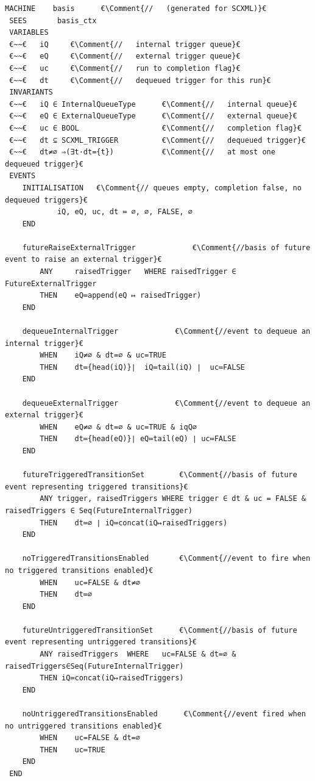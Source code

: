  \begin{lstfloat}[!tb]
 \begin{lstlisting}[caption={Abstract basis machine}, label={lst:BasisMachine},language=Event-B, escapechar=€, frame=single, basicstyle=\rmfamily\scriptsize, belowskip=-2.0 \baselineskip]
 MACHINE	basis	   €\Comment{//   (generated for SCXML)}€
 SEES    	basis_ctx
 VARIABLES
 €~~€	iQ	   €\Comment{//   internal trigger queue}€
 €~~€	eQ	   €\Comment{//   external trigger queue}€
 €~~€	uc	   €\Comment{//   run to completion flag}€
 €~~€	dt	   €\Comment{//   dequeued trigger for this run}€
 INVARIANTS
 €~~€	iQ ∈ InternalQueueType	   	€\Comment{//   internal queue}€
 €~~€	eQ ∈ ExternalQueueType	   	€\Comment{//   external queue}€
 €~~€	uc ∈ BOOL	   				€\Comment{//   completion flag}€
 €~~€	dt ⊆ SCXML_TRIGGER	   		€\Comment{//   dequeued trigger}€
 €~~€	dt≠∅ ⇒(∃t·dt={t})			€\Comment{//   at most one dequeued trigger}€
 EVENTS
 	INITIALISATION   €\Comment{// queues empty, completion false, no dequeued triggers}€
 			iQ, eQ, uc, dt ≔ ∅,	∅, FALSE, ∅  
 	END

 	futureRaiseExternalTrigger      	   €\Comment{//basis of future event to raise an external trigger}€
 		ANY 	raisedTrigger	WHERE raisedTrigger ∈ FutureExternalTrigger
 		THEN	eQ≔append(eQ ↦ raisedTrigger)
 	END

 	dequeueInternalTrigger      	   €\Comment{//event to dequeue an internal trigger}€ 
 		WHEN	iQ≠∅ & dt=∅ & uc=TRUE 
 		THEN	dt≔{head(iQ)}∣  iQ≔tail(iQ) ∣  uc≔FALSE
 	END

 	dequeueExternalTrigger      	   €\Comment{//event to dequeue an external trigger}€ 
 		WHEN	eQ≠∅ & dt=∅ & uc=TRUE & iqQ∅
		THEN	dt≔{head(eQ)}∣ eQ≔tail(eQ) ∣ uc≔FALSE
 	END

 	futureTriggeredTransitionSet      	€\Comment{//basis of future event representing triggered transitions}€
 		ANY trigger, raisedTriggers WHERE trigger ∈ dt & uc = FALSE & raisedTriggers ∈ Seq(FutureInternalTrigger)
 		THEN	dt≔∅ ∣ iQ≔concat(iQ↦raisedTriggers)
 	END

 	noTriggeredTransitionsEnabled      	€\Comment{//event to fire when no triggered transitions enabled}€ 
 		WHEN 	uc=FALSE & dt≠∅
 		THEN	dt≔∅
 	END

 	futureUntriggeredTransitionSet      €\Comment{//basis of future event representing untriggered transitions}€
 		ANY	raisedTriggers	WHERE	uc=FALSE & dt=∅ & raisedTriggers∈Seq(FutureInternalTrigger)
 		THEN iQ≔concat(iQ↦raisedTriggers)
 	END

 	noUntriggeredTransitionsEnabled      €\Comment{//event fired when no untriggered transitions enabled}€
 		WHEN	uc=FALSE & dt=∅
 		THEN	uc≔TRUE
 	END
 END
 \end{lstlisting}
 \end{lstfloat}

